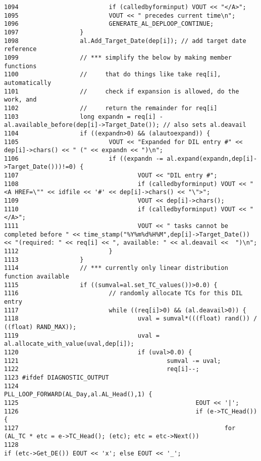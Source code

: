 \begin{verbatim}
1094                         if (calledbyforminput) VOUT << "</A>";
1095                         VOUT << " precedes current time\n";
1096                         GENERATE_AL_DEPLOOP_CONTINUE;
1097                 }
1098                 al.Add_Target_Date(dep[i]); // add target date reference
1099                 // *** simplify the below by making member functions
1100                 //     that do things like take req[i], automatically
1101                 //     check if expansion is allowed, do the work, and
1102                 //     return the remainder for req[i]
1103                 long expandn = req[i] - al.available_before(dep[i]->Target_Date()); // also sets al.deavail
1104                 if ((expandn>0) && (alautoexpand)) {
1105                         VOUT << "Expanded for DIL entry #" << dep[i]->chars() << " (" << expandn << ")\n";
1106                         if ((expandn -= al.expand(expandn,dep[i]->Target_Date()))!=0) {
1107                                 VOUT << "DIL entry #";
1108                                 if (calledbyforminput) VOUT << "<A HREF=\"" << idfile << '#' << dep[i]->chars() << "\">";
1109                                 VOUT << dep[i]->chars();
1110                                 if (calledbyforminput) VOUT << "</A>";
1111                                 VOUT << " tasks cannot be completed before " << time_stamp("%Y%m%d%H%M",dep[i]->Target_Date()) << "(required: " << req[i] << ", available: " << al.deavail <<  ")\n";
1112                         }
1113                 }
1114                 // *** currently only linear distribution function available
1115                 if ((sumval=al.set_TC_values())>0.0) {
1116                         // randomly allocate TCs for this DIL entry
1117                         while ((req[i]>0) && (al.deavail>0)) {
1118                                 uval = sumval*(((float) rand()) / ((float) RAND_MAX));
1119                                 uval = al.allocate_with_value(uval,dep[i]);
1120                                 if (uval>0.0) {
1121                                         sumval -= uval;
1122                                         req[i]--;
1123 #ifdef DIAGNOSTIC_OUTPUT
1124                                         PLL_LOOP_FORWARD(AL_Day,al.AL_Head(),1) {
1125                                                 EOUT << '|';
1126                                                 if (e->TC_Head()) { 
1127                                                         for (AL_TC * etc = e->TC_Head(); (etc); etc = etc->Next())
1128                                                                 if (etc->Get_DE()) EOUT << 'x'; else EOUT << '_';

\end{verbatim}
